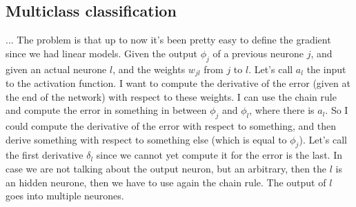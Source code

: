 \subsection{Multiclass classification}
...\newline
The problem is that up to now it's been pretty easy to define the gradient since we had linear models. \newline
Given the output $\phi_j$ of a previous neurone $j$, and given an actual neurone $l$, and the weights $w_{jl}$ from $j$ to $l$. Let's call $a_l$ the input to the activation function. I want to compute the derivative of the error (given at the end of the network) with respect to these weights. I can use the chain rule and compute the error in something in between $\phi_j$ and $\phi_l$, where there is $a_l$. So I could compute the derivative of the error with respect to something, and then derive something with respect to something else (which is equal to $\phi_j$). Let's call the first derivative $\delta_l$ since we cannot yet compute it for the error is the last.\newline
{}\newline
In case we are not talking about the output neuron, but an arbitrary, then the $l$ is an hidden neurone, then we have to use again the chain rule. The output of $l$ goes into multiple neurones.\newline
